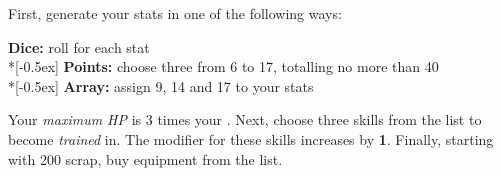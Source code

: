 
First, generate your stats in one of the following ways:

\textbf{Dice:} roll  for each stat \\*[-0.5ex]
\textbf{Points:} choose three from 6 to 17, totalling no more than 40 \\*[-0.5ex]
\textbf{Array:} assign 9, 14 and 17 to your stats

Your \emph{maximum HP} is 3 times your . Next, choose three skills from the list to become \emph{trained} in. The modifier for these skills increases by \textbf{1}. Finally, starting with 200 scrap, buy equipment from the list.
